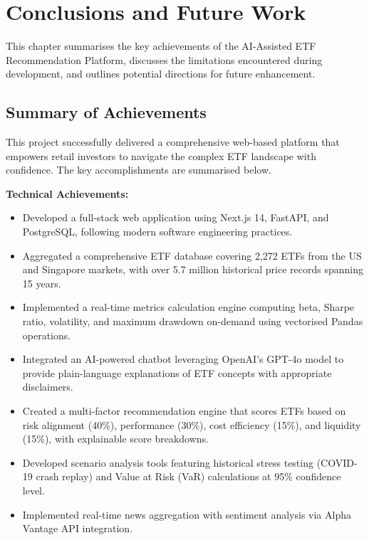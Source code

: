 \chapter{Conclusions and Future Work}
\label{chap:conclusions}

This chapter summarises the key achievements of the AI-Assisted ETF Recommendation Platform, discusses the limitations encountered during development, and outlines potential directions for future enhancement.

\section{Summary of Achievements}
\label{sec:achievements}

This project successfully delivered a comprehensive web-based platform that empowers retail investors to navigate the complex ETF landscape with confidence. The key accomplishments are summarised below.

\textbf{Technical Achievements:}
\begin{itemize}
    \item Developed a full-stack web application using Next.js 14, FastAPI, and PostgreSQL, following modern software engineering practices.
    \item Aggregated a comprehensive ETF database covering 2,272 ETFs from the US and Singapore markets, with over 5.7 million historical price records spanning 15 years.
    \item Implemented a real-time metrics calculation engine computing beta, Sharpe ratio, volatility, and maximum drawdown on-demand using vectorised Pandas operations.
    \item Integrated an AI-powered chatbot leveraging OpenAI's GPT-4o model to provide plain-language explanations of ETF concepts with appropriate disclaimers.
    \item Created a multi-factor recommendation engine that scores ETFs based on risk alignment (40\%), performance (30\%), cost efficiency (15\%), and liquidity (15\%), with explainable score breakdowns.
    \item Developed scenario analysis tools featuring historical stress testing (COVID-19 crash replay) and Value at Risk (VaR) calculations at 95\% confidence level.
    \item Implemented real-time news aggregation with sentiment analysis via Alpha Vantage API integration.
\end{itemize}


